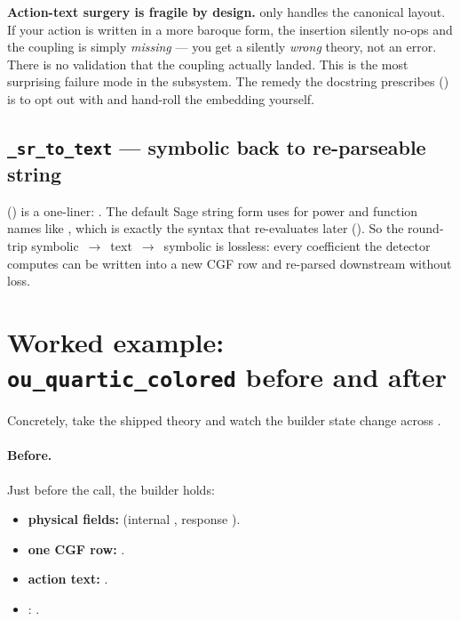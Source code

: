\begin{gotcha}
\textbf{Action-text surgery is fragile by design.} 
only handles the canonical  layout. If your action is written in
a more baroque form, the insertion silently no-ops and the  coupling is
simply \emph{missing} --- you get a silently \emph{wrong} theory, not an error.
There is no validation that the coupling actually landed. This is the most
surprising failure mode in the subsystem. The remedy the docstring prescribes
() is to opt out with
 and hand-roll the embedding yourself.
\end{gotcha}

\subsection{\texttt{\_sr\_to\_text} --- symbolic back to re-parseable string}
\label{sec:cm-srtotext}

 () is a
one-liner: . The default Sage string form uses
\code{\^{}} for power and function names like , which is exactly the
syntax that  re-evaluates
later (). So the round-trip
symbolic~$\to$~text~$\to$~symbolic is lossless: every coefficient the detector
computes can be written into a new CGF row and re-parsed downstream without loss.

\section{Worked example: \texttt{ou\_quartic\_colored} before and after}

Concretely, take the shipped  theory and watch the
builder state change across .

\paragraph{Before.} Just before the call, the builder holds:
\begin{itemize}
  \item \textbf{physical fields:}  (internal , response
        ).
  \item \textbf{one CGF row:}
        .
  \item \textbf{action text:} .
  \item {}: .
\end{itemize}

